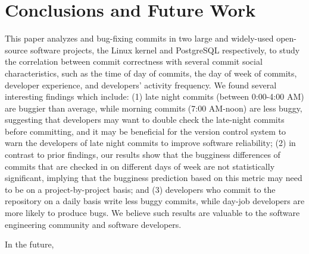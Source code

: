 \section{Conclusions and Future Work}
\label{sec-conclusion}

This paper analyzes \linuxBFC and \postBFC bug-fixing commits in two large and widely-used open-source software projects, 
the Linux kernel and PostgreSQL respectively, to study the correlation between commit correctness with 
several commit social characteristics, such as the time of day of commits,
the day of week of commits, developer experience, and developers' activity
frequency. We found several interesting findings which include: (1)  
late night commits (between 0:00-4:00 AM) are buggier than average, 
while morning commits (7:00 AM-noon) are less buggy, suggesting 
that developers may want to double check the late-night commits before committing, 
and it may be beneficial for the version control
system to warn the developers of late night commits to improve software reliability; 
(2) in contrast to prior findings, 
our results show that the bugginess differences of commits that are checked in on different days of week 
are not statistically significant, 
implying that the bugginess prediction based on this 
metric may need to be on a project-by-project basis;
and (3) developers who commit to the repository on a daily basis
write less buggy commits, while day-job developers are more likely to produce
bugs.
%
We believe such results are valuable to the software engineering community and 
software developers. 

In the future, 



